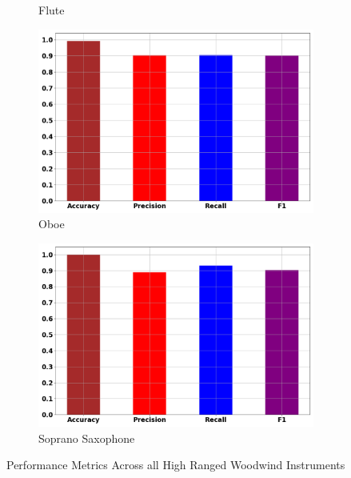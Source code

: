 \documentclass[12pt,letterpaper]{article}
\begin{document}
\begin{figure}[H]
\begin{subfigure}[b]{0.45\textwidth}
	\caption{Flute}
	\end{subfigure}	
	\begin{subfigure}[b]{0.45\textwidth}
	\centering
	\includegraphics[width=\textwidth]{../FiguresClasses/Oboe}
	\caption{Oboe}
	\end{subfigure}		
	\begin{subfigure}[b]{0.45 \textwidth}
	\centering
	\includegraphics[width=\textwidth]{../FiguresClasses/SopSax}
	\caption{Soprano Saxophone}
	\end{subfigure}
	
\caption{Performance Metrics Across all High Ranged Woodwind Instruments}
\label{fig-HighWindsScores}
\end{figure}
\end{document}
